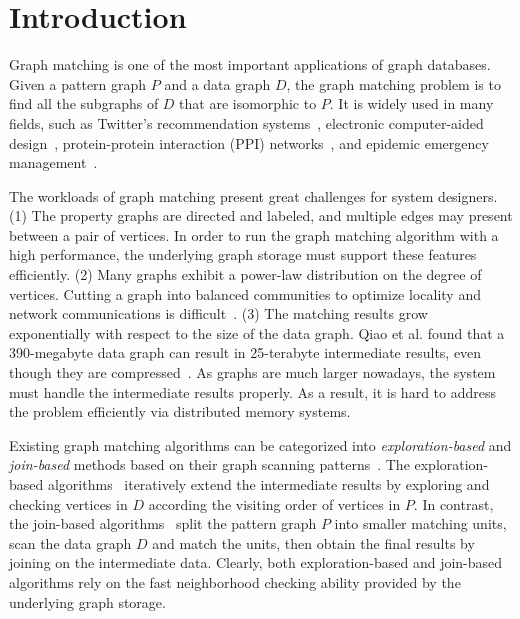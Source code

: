 \section{Introduction}
Graph matching is one of the most important applications of graph databases.
Given a pattern graph $P$ and a data graph $D$, the graph matching problem is to find all the subgraphs of $D$ that are isomorphic to $P$.
It is widely used in many fields,
such as Twitter's recommendation systems~\cite{DBLP:journals/pvldb/GuptaSGGZLL14,DBLP:journals/pvldb/SharmaJBLL16},
electronic computer-aided design~\cite{DBLP:conf/dac/OhlrichEGS93},
protein-protein interaction (PPI) networks~\cite{milenkovic2008uncovering},
and epidemic emergency management~\cite{info:doi/10.2196/26836}.

The workloads of graph matching present great challenges for system designers.
(1) The property graphs are directed and labeled, and multiple edges may present between a pair of vertices.
In order to run the graph matching algorithm with a high performance, the underlying graph storage must support these features efficiently.
(2) Many graphs exhibit a power-law distribution on the degree of vertices.
Cutting a graph into balanced communities to optimize locality and network communications is difficult~\cite{DBLP:journals/im/LeskovecLDM09}.
(3) The matching results grow exponentially with respect to the size of the data graph.
Qiao et al\@. found that a 390-megabyte data graph can result in 25-terabyte intermediate results, even though they are compressed~\cite{DBLP:journals/pvldb/QiaoZC17}.
As graphs are much larger nowadays, the system must handle the intermediate results properly.
As a result, it is hard to address the problem efficiently via distributed memory systems.

Existing graph matching algorithms can be categorized into \emph{exploration-based} and \emph{join-based} methods based on their graph scanning patterns~\cite{DBLP:journals/pvldb/SunSC0H20}.
The exploration-based algorithms~\cite{DBLP:journals/jacm/Ullmann76,DBLP:journals/pami/CordellaFSV04,DBLP:journals/pvldb/ShangZLY08,DBLP:conf/sigmod/HeS08,DBLP:conf/sigmod/HanLL13,DBLP:journals/pvldb/ZhaoH10,DBLP:journals/pvldb/LeeHKL12}
iteratively extend the intermediate results by exploring and checking vertices in $D$ according the visiting order of vertices in $P$.
In contrast, the join-based algorithms~\cite{DBLP:journals/pvldb/LaiQLC15,DBLP:journals/pvldb/QiaoZC17,DBLP:journals/pvldb/SunWWSL12,DBLP:journals/pvldb/MhedhbiS19,DBLP:journals/pvldb/LinMPS16,DBLP:journals/pvldb/AmmarMSJ18} split the pattern graph $P$ into smaller matching units, scan the data graph $D$ and match the units, then obtain the final results by joining on the intermediate data.
Clearly, both exploration-based and join-based algorithms rely on the fast neighborhood checking ability provided by the underlying graph storage.

